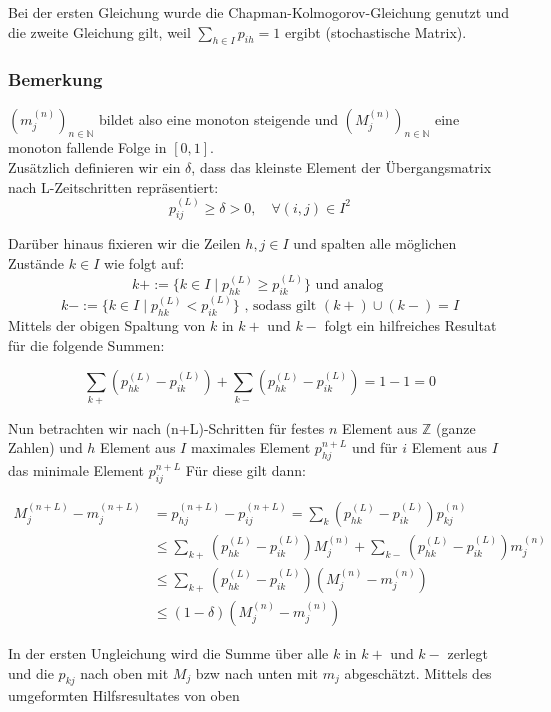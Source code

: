 \documentclass[a4paper]{article}
\begin{document}
Bei der ersten Gleichung wurde die Chapman-Kolmogorov-Gleichung genutzt und die zweite
Gleichung gilt, weil
$\sum_{h\in I} p_{ih} = 1$
ergibt (stochastische Matrix).

\subsubsection{Bemerkung}
$(m_j ^{(n)})_{n\in \mathbb{N}}$ bildet also eine monoton steigende und 
$(M_j ^{(n)})_{n \in \mathbb{N}}$
eine monoton fallende Folge in
$[0,1]$.
\\

Zusätzlich definieren wir ein $\delta$, dass das kleinste Element der Übergangsmatrix nach L-Zeitschritten
repräsentiert:
\[
p_{ij} ^{(L)} \geq \delta > 0, \quad
\forall (i, j) \in I^2
\] 

Darüber hinaus fixieren wir die Zeilen $h, j \in I$ und spalten alle
möglichen Zustände $k \in I$ wie folgt auf:
\[
k+ := \{
	k\in I \; \vert \; p_{hk} ^{(L)} \geq p_{ik} ^{(L)}
\} 
	\text{ und analog }
\] 
\[
k- := \{
	k\in I \; \vert \; p_{hk} ^{(L)} < p_{ik} ^{(L)}
\} \text{ , sodass gilt } (k+) \cup (k-) = I
\] 
Mittels der obigen Spaltung von $k$ in $k+$ und $k-$ folgt ein hilfreiches Resultat für die folgende Summen:

\[
\sum_{k+} \left(
	p_{hk} ^{(L)} - p_{ik} ^{(L)}
\right) + \sum_{k-} \left(
	p_{hk} ^{(L)} - p_{ik} ^{(L)}
\right) = 1 - 1 = 0
\] 

Nun betrachten wir nach (n+L)-Schritten für festes $n$ Element aus $\mathbb{Z}$ (ganze Zahlen) und $h$ Element
aus $I$ maximales Element $p_{hj} ^{n+L}$ und für $i$ Element aus $I$ das minimale Element $p_{ij} ^{n+L}$
Für diese gilt dann:

\begin{align*}
	M_j ^{(n+L)} - m_j ^{(n+L)} &= p_{hj} ^{(n+L)} - p_{ij} ^{(n+L)}
	= \sum_{k} \left(
		p_{hk} ^{(L)} - p_{ik} ^{(L)}
	\right) p_{kj} ^{(n)} \\
		& \leq \sum_{k+} \left(
			p_{hk} ^{(L)} - p_{ik} ^{(L)}
		\right) M_j ^{(n)} + \sum_{k-} \left(
			p_{hk} ^{(L)} - p_{ik} ^{(L)}
		\right) m_j ^{(n)} \\
		& \leq \sum_{k+} \left(
			p_{hk} ^{(L)} - p_{ik} ^{(L)}
		\right) \left(
			M_j ^{(n)} - m_j ^{(n)}
		\right) \\
		& \leq \left(
			1- \delta
		\right) \left(
			M_j ^{(n)} - m_j ^{(n)}
		\right) 
\end{align*}

In der ersten Ungleichung wird die Summe über alle $k$ in $k+$ und $k-$ zerlegt und die $p_{ kj }$ nach oben mit
$M_j$ bzw nach unten mit $m_j$ abgeschätzt. Mittels des umgeformten Hilfsresultates von oben
\end{document}
